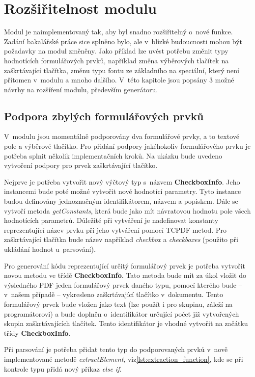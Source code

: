 \chapter{Rozšiřitelnost modulu}
Modul je naimplementovaný tak, aby byl snadno rozšiřitelný o~nové funkce. Zadání bakalářské práce sice splněno bylo, ale v~blízké budoucnosti mohou být požadavky na modul změněny. Jako příklad lze uvést potřebu změnit typy hodnotících formulářových prvků, například změna výběrových tlačítek na zaškrtávající tlačítka, změnu typu fontu ze základního na speciální, který není přítomen v~modulu a mnoho dalšího. V~této kapitole jsou popsány 3 možné návrhy na rozšíření modulu, především generátoru.

\section{Podpora zbylých formulářových prvků}
V~modulu jsou momentálně podporovány dva formulářové prvky, a to textové pole a výběrové tlačítko. Pro přidání podpory jakéhokoliv formulářového prvku je potřeba splnit několik implementačních kroků. Na ukázku bude uvedeno vytvoření podpory pro prvek zaškrtávající tlačítko.
\par
Nejprve je potřeba vytvořit nový výčtový typ s~názvem \textbf{CheckboxInfo}. Jeho instancemi bude poté možné vytvořit nové hodnotící parametry. Tyto instance budou definovány jednoznačným identifikátorem, názvem a popiskem. Dále se vytvoří metoda \textit{getConstants}, která bude jako mít návratovou hodnotu pole všech hodnotících parametrů. Důležité při vytváření je nadefinovat konstanty reprezentující název prvku při jeho vytváření pomocí TCPDF metod. Pro zaškrtávající tlačítka bude název například \textit{checkbox} a \textit{checkboxes} (použito při ukládání hodnot u~parsování).
\par
Pro generování kódu reprezentující určitý formulářový prvek je potřeba vytvořit novou metodu ve třídě \textbf{CheckboxInfo}. Tato metoda bude mít za úkol vložit do výsledného PDF jeden formulářový prvek daného typu, pomocí kterého bude -- v~našem případě -- vykresleno zaškrtávající tlačítko v~dokumentu. Tento formulářový prvek bude vložen jako text  (lze použít i pro skupinu, záleží na programátorovi) a bude doplněn o~identifikátor určující počet již vytvořených skupin zaškrtávajících tlačítek. Tento identifikátor je vhodné vytvořit na začátku třídy \textbf{CheckboxInfo}.
\par
Při parsování je potřeba přidat tento typ do podporovaných prvků v~nově implementované metodě \textit{extractElement}, viz\ref{lst:extraction_function}, kde se při kontrole typu přidá nový příkaz \textit{else if}.
